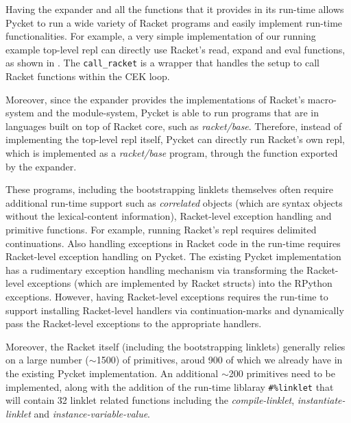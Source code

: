 Having the expander and all the functions that it provides in its
run-time allows Pycket to run a wide variety of Racket programs and
easily implement run-time functionalities. For example, a very simple
implementation of our running example top-level repl can directly use
Racket's read, expand and eval functions, as shown in
. The \verb|call_racket| is a wrapper that
handles the setup to call Racket functions within the CEK loop.

Moreover, since the expander provides the implementations of Racket's
macro-system and the module-system, Pycket is able to run programs
that are in languages built on top of Racket core, such as
\emph{racket/base}. Therefore, instead of implementing the top-level
repl itself, Pycket can directly run Racket's own repl, which is
implemented as a \emph{racket/base} program, through the
 function exported by the expander.


These programs, including the bootstrapping linklets themselves often
require additional run-time support such as \emph{correlated} objects
(which are syntax objects without the lexical-content information),
Racket-level exception handling and primitive functions. For example,
running Racket's repl requires delimited continuations. Also handling
exceptions in Racket code in the run-time requires Racket-level
exception handling on Pycket. The existing Pycket implementation has a
rudimentary exception handling mechanism via transforming the
Racket-level exceptions (which are implemented by Racket structs) into
the RPython exceptions. However, having Racket-level exceptions
requires the run-time to support installing Racket-level handlers via
continuation-marks and dynamically pass the Racket-level exceptions to
the appropriate handlers.

Moreover, the Racket itself (including the bootstrapping linklets)
generally relies on a large number ($\sim$1500) of primitives, aroud 900
of which we already have in the existing Pycket implementation. An
additional $\sim$200 primitives need to be implemented, along with the
addition of the run-time liblaray \texttt{\#\%linklet} that will
contain 32 linklet related functions including the
\emph{compile-linklet}, \emph{instantiate-linklet} and
\emph{instance-variable-value}.